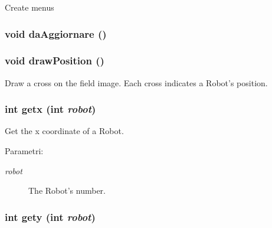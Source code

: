 Create menus \hypertarget{classMainWindow_149ee428e4d3b41686c3a5e1879b30a2}{
\subsubsection[daAggiornare]{\setlength{\rightskip}{0pt plus 5cm}void da\-Aggiornare ()}}
\label{classMainWindow_149ee428e4d3b41686c3a5e1879b30a2}


\hypertarget{classMainWindow_772ba2e39bd737fa1fb38507c55b6acb}{
\subsubsection[drawPosition]{\setlength{\rightskip}{0pt plus 5cm}void draw\-Position ()}}
\label{classMainWindow_772ba2e39bd737fa1fb38507c55b6acb}


Draw a cross on the field image. Each cross indicates a Robot's position. \hypertarget{classMainWindow_ff0645ac68ad121ee2d70f8f989dca42}{
\subsubsection[getx]{\setlength{\rightskip}{0pt plus 5cm}int getx (int {\em robot})}}
\label{classMainWindow_ff0645ac68ad121ee2d70f8f989dca42}


Get the x coordinate of a Robot. \begin{Desc}
\item[Parametri:]
\begin{description}
\item[{\em robot}]The Robot's number. \end{description}
\end{Desc}
\hypertarget{classMainWindow_031e0654d92e39b23d56749657a05d05}{
\subsubsection[gety]{\setlength{\rightskip}{0pt plus 5cm}int gety (int {\em robot})}}
\label{classMainWindow_031e0654d92e39b23d56749657a05d05}


